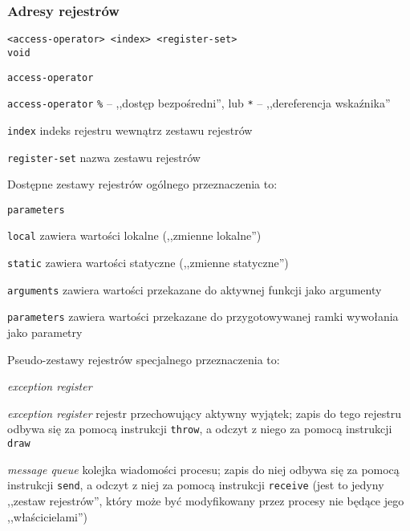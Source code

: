\subsubsection{Adresy rejestrów}
\label{appendix_viua_vm_assembly_language_register_addrs}

\begin{lstlisting}
<access-operator> <index> <register-set>
void
\end{lstlisting}

\begin{labeling}{\texttt{access-operator}}
\item[\texttt{access-operator}] \texttt{\%} -- ,,dostęp bezpośredni'', lub
	\texttt{*} -- ,,dereferencja wskaźnika''
\item[\texttt{index}] indeks rejestru wewnątrz zestawu rejestrów
\item[\texttt{register-set}] nazwa zestawu rejestrów
\end{labeling}

Dostępne zestawy rejestrów ogólnego przeznaczenia to:

\begin{labeling}{\texttt{parameters}}
\item[\texttt{local}] zawiera wartości lokalne (,,zmienne lokalne'')
\item[\texttt{static}] zawiera wartości statyczne (,,zmienne statyczne'')
\item[\texttt{arguments}] zawiera wartości przekazane do aktywnej funkcji jako argumenty
\item[\texttt{parameters}] zawiera wartości przekazane do przygotowywanej ramki wywołania jako parametry
\end{labeling}

Pseudo-zestawy rejestrów specjalnego przeznaczenia to:

\begin{labeling}{\emph{exception register}}
\item[\emph{exception register}] rejestr przechowujący aktywny wyjątek; zapis do
    tego rejestru odbywa się za pomocą instrukcji \texttt{throw}, a odczyt z
    niego za pomocą instrukcji \texttt{draw}
\item[\emph{message queue}] kolejka wiadomości procesu; zapis do niej odbywa się
    za pomocą instrukcji \texttt{send}, a odczyt z niej za pomocą instrukcji
    \texttt{receive} (jest to jedyny ,,zestaw rejestrów'', który może być
    modyfikowany przez procesy nie będące jego ,,właścicielami'')
\end{labeling}

